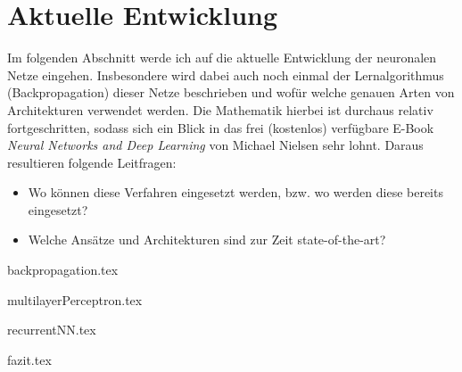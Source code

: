 \part{Aktuelle Entwicklung}

Im folgenden Abschnitt werde ich auf die aktuelle Entwicklung der neuronalen Netze eingehen. Insbesondere wird dabei auch noch einmal der Lernalgorithmus (Backpropagation) dieser Netze beschrieben und wofür welche genauen Arten von Architekturen verwendet werden. Die Mathematik hierbei ist durchaus relativ fortgeschritten, sodass sich ein Blick in das frei (kostenlos) verfügbare E-Book \emph{Neural Networks and Deep Learning} von Michael Nielsen \cite{dlnielsen} sehr lohnt. Daraus resultieren folgende Leitfragen: 

\begin{itemize}
\item Wo können diese Verfahren eingesetzt werden, bzw. wo werden diese bereits eingesetzt?
\item Welche Ansätze und Architekturen sind zur Zeit state-of-the-art?
\end{itemize}

{backpropagation.tex}
\clearpage

{multilayerPerceptron.tex}
\clearpage

{recurrentNN.tex}
\clearpage

{fazit.tex}
\clearpage

